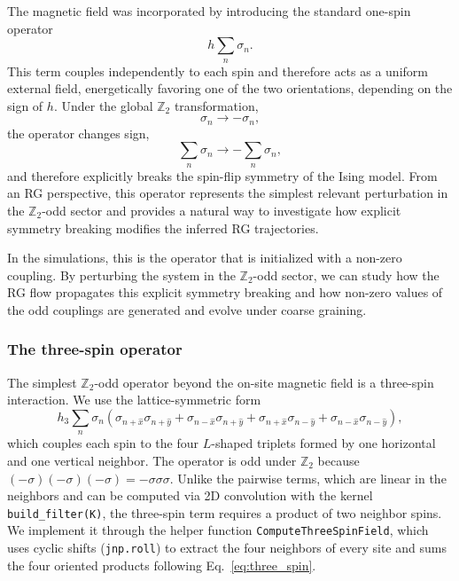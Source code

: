 \documentclass[a4paper, 11pt]{article}
\begin{document}
The magnetic field was incorporated by introducing the standard one-spin operator
\begin{equation*}
    h \sum_n \sigma_n .
\end{equation*}
This term couples independently to each spin and therefore acts as a uniform external field, energetically favoring one of the two orientations, depending on the sign of $h$. Under the global $\mathbb{Z}_2$ transformation,
\begin{equation*}
    \sigma_n \rightarrow -\sigma_n,
\end{equation*}
the operator changes sign,
\begin{equation*}
    \sum_n \sigma_n \rightarrow - \sum_n \sigma_n,
\end{equation*}
and therefore explicitly breaks the spin-flip symmetry of the Ising model. From an RG perspective, this operator represents the simplest relevant perturbation in the $\mathbb{Z}_2$-odd sector and provides a natural way to investigate how explicit symmetry breaking modifies the inferred RG trajectories. 

In the simulations, this is the operator that is initialized with a non-zero coupling. By perturbing the system in the $\mathbb{Z}_2$-odd sector, we can study how the RG flow propagates this explicit symmetry breaking and how non-zero values of the odd couplings are generated and evolve under coarse graining.

\subsubsection*{The three-spin operator}

The simplest $\mathbb{Z}_2$-odd operator beyond the on-site magnetic field is a three-spin interaction. We use the lattice-symmetric form
\begin{equation}
  h_3 \sum_n \sigma_n
  \!\left(
    \sigma_{n+\hat{x}}\sigma_{n+\hat{y}}
   +\sigma_{n-\hat{x}}\sigma_{n+\hat{y}}
   +\sigma_{n+\hat{x}}\sigma_{n-\hat{y}}
   +\sigma_{n-\hat{x}}\sigma_{n-\hat{y}}
  \right),
  \label{eq:three_spin}
\end{equation}
which couples each spin to the four $L$-shaped triplets formed by one horizontal and one vertical neighbor. The operator is odd under $\mathbb{Z}_2$ because $(-\sigma)(-\sigma)(-\sigma)=-\sigma\sigma\sigma$. Unlike the pairwise terms, which are linear in the neighbors and can be computed via 2D convolution with the kernel \texttt{build\_filter(K)}, the three-spin term requires a product of two neighbor spins. We implement it through the helper function \texttt{ComputeThreeSpinField}, which uses cyclic shifts (\texttt{jnp.roll}) to extract the four neighbors of every site and sums the four oriented products following Eq.~\eqref{eq:three_spin}.
\end{document}
